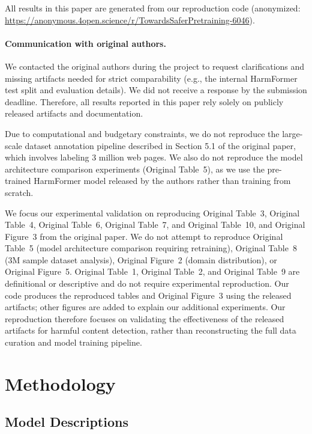 \documentclass[10pt]{article} %
\newcommand{\origTable}[1]{Original Table~#1}
\newcommand{\origFig}[1]{Original Figure~#1}
\begin{document}
All results in this paper are generated from our reproduction code (anonymized: \url{https://anonymous.4open.science/r/TowardsSaferPretraining-6046}).

\paragraph{Communication with original authors.}
We contacted the original authors during the project to request clarifications and missing artifacts needed for strict comparability (e.g., the internal HarmFormer test split and evaluation details). We did not receive a response by the submission deadline. Therefore, all results reported in this paper rely solely on publicly released artifacts and documentation.

Due to computational and budgetary constraints, we do not reproduce the large-scale dataset annotation pipeline described in Section 5.1 of the original paper, which involves labeling 3 million web pages. We also do not reproduce the model architecture comparison experiments (\origTable{5}), as we use the pre-trained HarmFormer model released by the authors rather than training from scratch.


We focus our experimental validation on reproducing \origTable{3}, \origTable{4}, \origTable{6}, \origTable{7}, and \origTable{10}, and \origFig{3} from the original paper.
 We do not attempt to reproduce \origTable{5} (model architecture comparison requiring retraining), \origTable{8} (3M sample dataset analysis), \origFig{2} (domain distribution), or \origFig{5}. \origTable{1}, \origTable{2}, and \origTable{9} are definitional or descriptive and do not require experimental reproduction. Our code produces the reproduced tables and \origFig{3} using the released artifacts; other figures are added to explain our additional experiments.
Our reproduction therefore focuses on validating the effectiveness of the released artifacts for harmful content detection, rather than reconstructing the full data curation and model training pipeline.


\section{Methodology}

\subsection{Model Descriptions}
\end{document}
